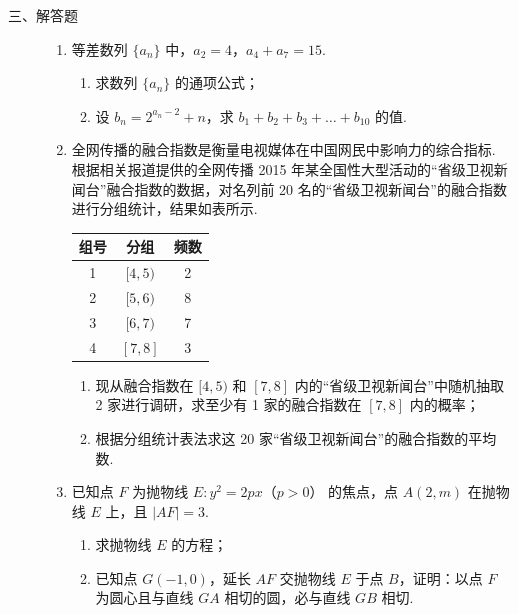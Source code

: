 \begin{description}

    \item[三、解答题]

    \begin{enumerate}[leftmargin=5pt]

      \addtocounter{enumi}{+16}

        \item 等差数列 \(\{a_{n}\}\) 中，\(a_{2} = 4\)，\(a_{4} + a_{7} = 15\).

\begin{enumerate}
\item 求数列 \(\{a_{n}\}\) 的通项公式；
\item 设 \(b_{n} = 2^{a_{n} - 2} + n\)，求 \(b_{1} + b_{2} + b_{3} + \dots + b_{10}\) 的值.
\end{enumerate}

        \item 全网传播的融合指数是衡量电视媒体在中国网民中影响力的综合指标. 根据相关报道提供的全网传播 2015 年某全国性大型活动的“省级卫视新闻台”融合指数的数据，对名列前 20 名的“省级卫视新闻台”的融合指数进行分组统计，结果如表所示.

\begin{center}
\begin{tabular}{|c|c|c|}
\hline
组号 & 分组 & 频数 \\
\hline
1 & \([4,5)\) & 2 \\
2 & \([5,6)\) & 8 \\
3 & \([6,7)\) & 7 \\
4 & \([7,8]\) & 3 \\
\hline
\end{tabular}
\end{center}

\begin{enumerate}
\item 现从融合指数在 \([4, 5)\) 和 \([7, 8]\) 内的“省级卫视新闻台”中随机抽取 2 家进行调研，求至少有 1 家的融合指数在 \([7, 8]\) 内的概率；
\item 根据分组统计表法求这 20 家“省级卫视新闻台”的融合指数的平均数.
\end{enumerate}

        \item 已知点 \(F\) 为抛物线 \(E: y^{2} = 2px\)（\(p > 0\)） 的焦点，点 \(A(2, m)\) 在抛物线 \(E\) 上，且 \(|AF| = 3\).

\begin{enumerate}
\item 求抛物线 \(E\) 的方程；
\item 已知点 \(G(-1,0)\)，延长 \(AF\) 交抛物线 \(E\) 于点 \(B\)，证明：以点 \(F\) 为圆心且与直线 \(GA\) 相切的圆，必与直线 \(GB\) 相切.
\end{enumerate}


\end{enumerate}
\end{description}
